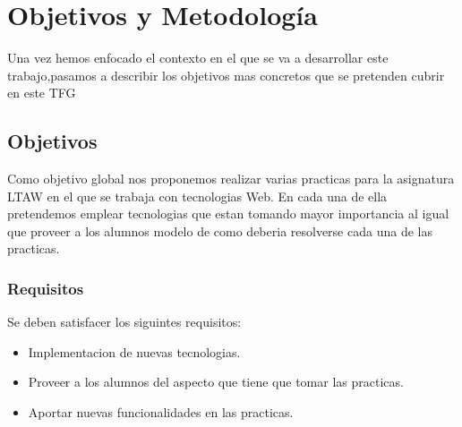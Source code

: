 \chapter{Objetivos y Metodología} 
\label{Chapter2} 
Una vez  hemos enfocado el contexto en el que se va a desarrollar este trabajo,pasamos a describir los objetivos mas concretos que se pretenden cubrir en este TFG
\section{Objetivos}
Como objetivo global nos proponemos realizar varias practicas para la asignatura LTAW en el que se trabaja con tecnologias Web. En cada una de ella pretendemos emplear tecnologias que estan tomando mayor importancia al igual que proveer a los alumnos modelo de como deberia resolverse cada una de las practicas.
\subsection{Requisitos}
Se deben satisfacer los siguintes requisitos:
\begin{itemize}
\item Implementacion de nuevas tecnologias.
\item Proveer a los alumnos del aspecto que tiene que tomar las practicas.
\item Aportar nuevas funcionalidades en las practicas.
\end{itemize}
